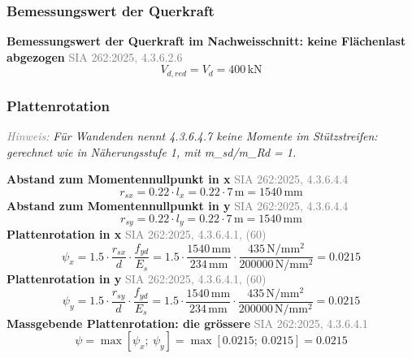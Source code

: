 \documentclass[11pt,a4paper]{article}
\newcommand{\normref}[1]{{\small\textcolor{gray}{#1}}}
\newcommand{\hinweis}[2]{\par\noindent\textcolor{gray}{\textit{#1:}} \textit{#2}\par}
\begin{document}
\subsubsection{Bemessungswert der Querkraft}
\noindent\textbf{Bemessungswert der Querkraft im Nachweisschnitt: keine Flächenlast abgezogen} \hfill \normref{SIA 262:2025, 4.3.6.2.6}
\begin{equation*}
V_{d,red} = V_d = 400\,\mathrm{kN}
\end{equation*}
\subsubsection{Plattenrotation}
\hinweis{Hinweis}{Für Wandenden nennt 4.3.6.4.7 keine Momente im Stützstreifen: gerechnet wie in Näherungsstufe 1, mit m\_sd/m\_Rd = 1.}
\noindent\textbf{Abstand zum Momentennullpunkt in x} \hfill \normref{SIA 262:2025, 4.3.6.4.4}
\begin{equation*}
r_{sx} = 0.22 \cdot l_x = 0.22 \cdot 7\,\mathrm{m} = 1540\,\mathrm{mm}
\end{equation*}
\noindent\textbf{Abstand zum Momentennullpunkt in y} \hfill \normref{SIA 262:2025, 4.3.6.4.4}
\begin{equation*}
r_{sy} = 0.22 \cdot l_y = 0.22 \cdot 7\,\mathrm{m} = 1540\,\mathrm{mm}
\end{equation*}
\noindent\textbf{Plattenrotation in x} \hfill \normref{SIA 262:2025, 4.3.6.4.1, (60)}
\begin{equation*}
\psi_x = 1.5 \cdot \frac{r_{sx}}{d} \cdot \frac{f_{yd}}{E_s} = 1.5 \cdot \frac{1540\,\mathrm{mm}}{234\,\mathrm{mm}} \cdot \frac{435\,\mathrm{N}/\mathrm{mm}^{2}}{200000\,\mathrm{N}/\mathrm{mm}^{2}} = 0.0215
\end{equation*}
\noindent\textbf{Plattenrotation in y} \hfill \normref{SIA 262:2025, 4.3.6.4.1, (60)}
\begin{equation*}
\psi_y = 1.5 \cdot \frac{r_{sy}}{d} \cdot \frac{f_{yd}}{E_s} = 1.5 \cdot \frac{1540\,\mathrm{mm}}{234\,\mathrm{mm}} \cdot \frac{435\,\mathrm{N}/\mathrm{mm}^{2}}{200000\,\mathrm{N}/\mathrm{mm}^{2}} = 0.0215
\end{equation*}
\noindent\textbf{Massgebende Plattenrotation: die grössere} \hfill \normref{SIA 262:2025, 4.3.6.4.1}
\begin{equation*}
\psi = \max\left[\psi_x;\ \psi_y\right] = \max\left[0.0215;\ 0.0215\right] = 0.0215
\end{equation*}
\end{document}
